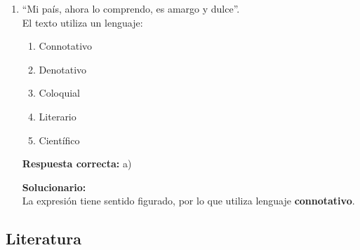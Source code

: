 \begin{enumerate}
	\vspace{2mm}
	\textbf{Solucionario:}\\
	Esa etapa es la \textbf{redacción}, donde las ideas ya se expresan por escrito.
	
	\vspace{6mm}
	
	\item “Mi país, ahora lo comprendo, es amargo y dulce”.\\
	El texto utiliza un lenguaje:
	\begin{enumerate}[label=\alph*)]
		\item Connotativo
		\item Denotativo
		\item Coloquial
		\item Literario
		\item Científico
	\end{enumerate}
	\textbf{Respuesta correcta:} a)
	
	\vspace{2mm}
	\textbf{Solucionario:}\\
	La expresión tiene sentido figurado, por lo que utiliza lenguaje \textbf{connotativo}.
	
	\vspace{6mm}
	
\end{enumerate}

\subsection*{Literatura}

